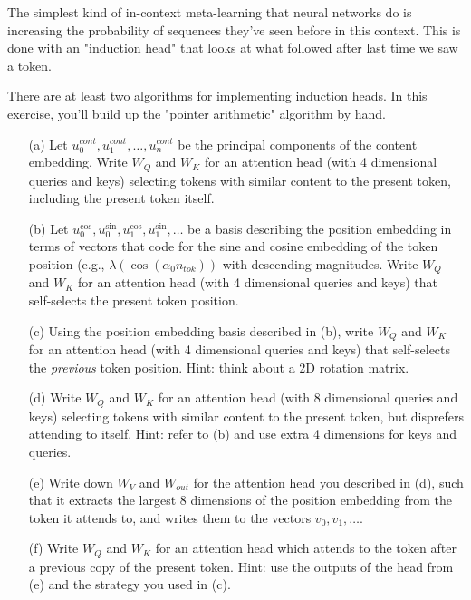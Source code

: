 \documentclass[11pt]{article}
\begin{document}
The simplest kind of in-context meta-learning that neural networks do is increasing the probability of sequences they've seen before in this context. This is done with an "induction head" that looks at what followed after last time we saw a token.


There are at least two algorithms for implementing induction heads. In this exercise, you'll build up the "pointer arithmetic" algorithm by hand.

\begin{itemize}
    \item[(a)] Let $u_0^{cont}, u_1^{cont}, \ldots, u_n^{cont}$ be the principal components of the content embedding. Write $W_Q$ and $W_K$ for an attention head (with 4 dimensional queries and keys) selecting tokens with similar content to the present token, including the present token itself.
    
    \item[(b)] Let $u_0^{\cos}, u_0^{\sin}, u_1^{\cos}, u_1^{\sin}, \ldots$ be a basis describing the position embedding in terms of vectors that code for the sine and cosine embedding of the token position (e.g., $\lambda(\cos(\alpha_0 n_{tok}))$ with descending magnitudes. Write $W_Q$ and $W_K$ for an attention head (with 4 dimensional queries and keys) that self-selects the present token position.
    
    \item[(c)] Using the position embedding basis described in (b), write $W_Q$ and $W_K$ for an attention head (with 4 dimensional queries and keys) that self-selects the \emph{previous} token position. Hint: think about a 2D rotation matrix.
    
    \item[(d)] Write $W_Q$ and $W_K$ for an attention head (with 8 dimensional queries and keys) selecting tokens with similar content to the present token, but disprefers attending to itself. Hint: refer to (b) and use extra 4 dimensions for keys and queries.
    
    \item[(e)] Write down $W_V$ and $W_{out}$ for the attention head you described in (d), such that it extracts the largest 8 dimensions of the position embedding from the token it attends to, and writes them to the vectors $v_0, v_1, \ldots$.
    
    \item[(f)] Write $W_Q$ and $W_K$ for an attention head which attends to the token after a previous copy of the present token. Hint: use the outputs of the head from (e) and the strategy you used in (c).
\end{itemize}
\end{document}
